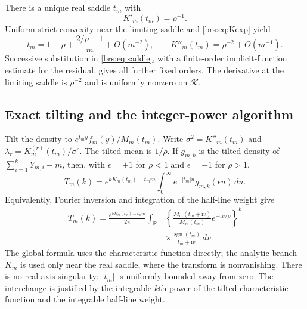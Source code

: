\documentclass[11pt]{article}
\numberwithin{equation}{section}
\theoremstyle{remark}\newtheorem{remark}[theorem]{Remark}
\newcommand{\ii}{\mathrm i}\newcommand{\sgn}{\operatorname{sgn}}
\begin{document}
There is a unique real saddle $t_m$ with
\begin{equation}\label{brs:eq:saddle}
 K'_m(t_m)=\rho^{-1}.
\end{equation}
Uniform strict convexity near the limiting saddle and
\eqref{brs:eq:Kexp} yield
\begin{equation}\label{brs:eq:tshift}
 t_m=1-\rho+\frac{2/\rho-1}{m}+O(m^{-2}),\qquad
 K''_m(t_m)=\rho^{-2}+O(m^{-1}).
\end{equation}
Successive substitution in \eqref{brs:eq:saddle}, with a finite-order
implicit-function estimate for the residual, gives all further fixed
orders.  The derivative at the limiting saddle is $\rho^{-2}$ and is
uniformly nonzero on $\mathcal K$.

\subsection{Exact tilting and the integer-power algorithm}

Tilt the density to
$e^{t_my}f_m(y)/M_m(t_m)$.  Write $\sigma^2=K''_m(t_m)$ and
$\lambda_r=K_m^{(r)}(t_m)/\sigma^r$.  The tilted mean is $1/\rho$.
If $g_{m,k}$ is the tilted density of $\sum_{i=1}^kY_{m,i}-m$, then,
with $\epsilon=+1$ for $\rho<1$ and $\epsilon=-1$ for $\rho>1$,
\begin{equation}\label{brs:eq:tilt}
 T_m(k)=e^{kK_m(t_m)-t_mm}
 \int_0^\infty e^{-|t_m|u}g_{m,k}(\epsilon u)\,du.
\end{equation}
Equivalently, Fourier inversion and integration of the half-line weight
give
\begin{align}\label{brs:eq:tailfourier}
 T_m(k)=\frac{e^{kK_m(t_m)-t_mm}}{2\pi}
 \int_{\mathbb R}&\left\{\frac{M_m(t_m+\ii v)}{M_m(t_m)}e^{-\ii v/\rho}\right\}^{k}\\
 &\times\frac{\sgn(t_m)}{t_m+\ii v}\,dv.\nonumber
\end{align}
The global formula uses the characteristic function directly; the analytic
branch $K_m$ is used only near the real saddle, where the transform is
nonvanishing.  There is no real-axis singularity: $|t_m|$ is uniformly bounded away
from zero.  The interchange is justified by the integrable $k$th power
of the tilted characteristic function and the integrable half-line
weight.
\end{document}
